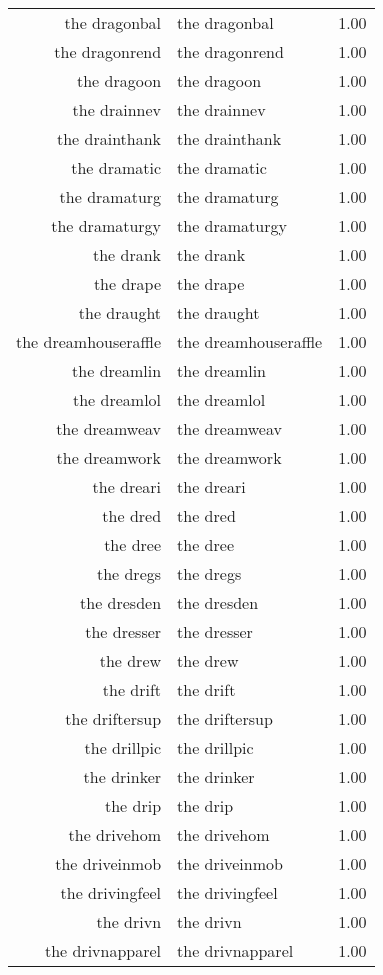 \begin{table}[ht]
\begin{tabular}{rlr}
  the dragonbal & the dragonbal & 1.00 \\ 
  the dragonrend & the dragonrend & 1.00 \\ 
  the dragoon & the dragoon & 1.00 \\ 
  the drainnev & the drainnev & 1.00 \\ 
  the drainthank & the drainthank & 1.00 \\ 
  the dramatic & the dramatic & 1.00 \\ 
  the dramaturg & the dramaturg & 1.00 \\ 
  the dramaturgy & the dramaturgy & 1.00 \\ 
  the drank & the drank & 1.00 \\ 
  the drape & the drape & 1.00 \\ 
  the draught & the draught & 1.00 \\ 
  the dreamhouseraffle & the dreamhouseraffle & 1.00 \\ 
  the dreamlin & the dreamlin & 1.00 \\ 
  the dreamlol & the dreamlol & 1.00 \\ 
  the dreamweav & the dreamweav & 1.00 \\ 
  the dreamwork & the dreamwork & 1.00 \\ 
  the dreari & the dreari & 1.00 \\ 
  the dred & the dred & 1.00 \\ 
  the dree & the dree & 1.00 \\ 
  the dregs & the dregs & 1.00 \\ 
  the dresden & the dresden & 1.00 \\ 
  the dresser & the dresser & 1.00 \\ 
  the drew & the drew & 1.00 \\ 
  the drift & the drift & 1.00 \\ 
  the driftersup & the driftersup & 1.00 \\ 
  the drillpic & the drillpic & 1.00 \\ 
  the drinker & the drinker & 1.00 \\ 
  the drip & the drip & 1.00 \\ 
  the drivehom & the drivehom & 1.00 \\ 
  the driveinmob & the driveinmob & 1.00 \\ 
  the drivingfeel & the drivingfeel & 1.00 \\ 
  the drivn & the drivn & 1.00 \\ 
  the drivnapparel & the drivnapparel & 1.00 \\ 

\end{tabular}
\end{table}
